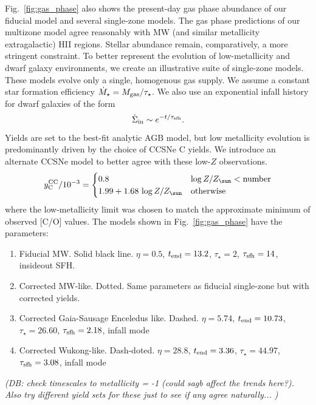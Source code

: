 \documentclass[fleqn,
referee, %
usenatbib]{mnras}
\newcommand{\Ycc}{{y_{\rm C}^{\rm CC}}}
\newcommand{\Zo}{ Z_{\sun}}
\newcommand{\dbnote}[1]{ {\color{Thistle} \textit{\small (DB: #1)}} }
\begin{document}
Fig.~\ref{fig:gas_phase} also shows the present-day gas phase abundance of our fiducial model and several single-zone models. The gas phase predictions of our multizone model agree reasonably with MW (and similar metallicity extragalactic) HII regions. Stellar abundance remain, comparatively, a more stringent constraint. To better represent the evolution of low-metallicity and dwarf galaxy environments, we create an illustrative suite of single-zone models. These models evolve only a single, homogenous gas supply. We assume a constant star formation efficiency $\dot M_\star = M_{\rm gas} / \tau_\star$. We also use an exponential infall history for dwarf galaxies of the form
\begin{equation}
    \dot\Sigma_{\rm in} \sim e^{-t/\tau_{\rm sfh}}.
\end{equation}
Yields are set to the best-fit analytic AGB model, but low metallicity evolution is predominantly driven by the choice of CCSNe C yields. We introduce an alternate CCSNe model to better agree with these low-$Z$ observations.
\begin{equation} 
    \Ycc / 10^{-3} = \begin{cases}
        0.8 & \log Z / \Zo < {\rm number} \\
        1.99 + 1.68\, \log Z / \Zo & {\rm otherwise }
    \end{cases}
\end{equation}
where the low-metallicity limit was chosen to match the approximate minimum of observed [C/O] values.
The models shown in Fig.~\ref{fig:gas_phase} have the parameters: 
\begin{enumerate}
    \item Fiducial MW. Solid black line. $\eta=0.5$, $t_{\rm end} = 13.2$, $\tau_\star=2$, $\tau_{\rm sfh} = 14$, insideout SFH.
    \item Corrected MW-like. Dotted. Same parameters as  fiducial single-zone but with corrected yields.
    \item Corrected Gaia-Sausage Enceledus like. Dashed. $\eta=5.74$, $t_{\rm end}=10.73$, $\tau_\star = 26.60$, $\tau_{\rm sfh} = 2.18$, infall mode
    \item Corrected Wukong-like. Dash-doted. $\eta=28.8$, $t_{\rm end} = 3.36$, $\tau_\star=44.97$, $\tau_{\rm sfh} = 3.08$, infall mode
\end{enumerate}
\dbnote{check timescales to metallicity = -1 (could sagb affect the trends here?). Also try different yield sets for these just to see if any agree naturally... }
\end{document}

